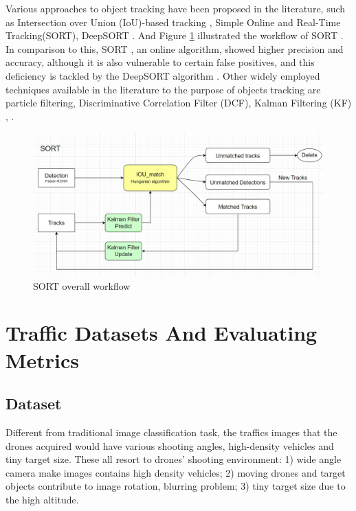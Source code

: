 \documentclass[10pt,twocolumn,letterpaper]{article}  %
\begin{document}
Various approaches to object tracking have been proposed in the literature, such as Intersection over Union (IoU)-based tracking \cite{yu2022frequency}, Simple Online and Real-Time Tracking(SORT)\cite{bewley2016simple}, DeepSORT \cite{wojke2017simple}. And Figure \ref{fig:bewley2016simple_SORT_framework_SORT} illustrated the workflow of SORT \cite{bewley2016simple}.
In comparison to this, SORT \cite{bewley2016simple}, an online algorithm, showed higher precision and accuracy, although it is also vulnerable to certain false positives, and this deficiency is tackled by the DeepSORT algorithm \cite{wojke2017simple}. Other widely employed techniques available in the literature to the purpose of objects tracking are particle filtering, Discriminative Correlation Filter (DCF), Kalman Filtering (KF) \cite{cuevas2005kalman}, \cite{chui2017kalman}.


\begin{figure}[!t]
	\centering
	\includegraphics[width=0.95\linewidth]{./figures/MOT_framework_SORT.jpg} %
	\caption{SORT \cite{bewley2016simple} overall workflow}
	\label{fig:bewley2016simple_SORT_framework_SORT}
\end{figure}




\section{Traffic Datasets And Evaluating Metrics}
\label{section:Datasets-metrics}
\subsection{Dataset}
Different from traditional image classification task, the traffics images that the drones acquired would have various shooting angles, high-density vehicles and tiny target size. These all resort to drones' shooting environment: 1)  wide angle camera make images contains high density vehicles; 2) moving drones and target objects contribute to image rotation, blurring problem; 3) tiny target size due to the high altitude.
\end{document}
